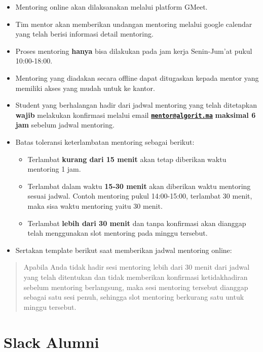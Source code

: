 \documentclass[
]{book}
\providecommand{\tightlist}{%
  \setlength{\itemsep}{0pt}\setlength{\parskip}{0pt}}
\begin{document}
\begin{itemize}
\tightlist
\item
  Mentoring online akan dilaksanakan melalui platform GMeet.
\item
  Tim mentor akan memberikan undangan mentoring melalui google calendar yang telah berisi informasi detail mentoring.
\item
  Proses mentoring \textbf{hanya} bisa dilakukan pada jam kerja Senin-Jum'at pukul 10:00-18:00.
\item
  Mentoring yang diadakan secara offline dapat ditugaskan kepada mentor yang memiliki akses yang mudah untuk ke kantor.
\item
  Student yang berhalangan hadir dari jadwal mentoring yang telah ditetapkan \textbf{wajib} melakukan konfirmasi melalui email \textbf{\href{mailto:mentor@algorit.ma}{\nolinkurl{mentor@algorit.ma}}} \textbf{maksimal 6 jam} sebelum jadwal mentoring.
\item
  Batas toleransi keterlambatan mentoring sebagai berikut:

  \begin{itemize}
  \tightlist
  \item
    Terlambat \textbf{kurang dari 15 menit} akan tetap diberikan waktu mentoring 1 jam.
  \item
    Terlambat dalam waktu \textbf{15-30 menit} akan diberikan waktu mentoring sesuai jadwal. Contoh mentoring pukul 14:00-15:00, terlambat 30 menit, maka sisa waktu mentoring yaitu 30 menit.
  \item
    Terlambat \textbf{lebih dari 30 menit} dan tanpa konfirmasi akan dianggap telah menggunakan slot mentoring pada minggu tersebut.
  \end{itemize}
\item
  Sertakan template berikut saat memberikan jadwal mentoring online:
\end{itemize}

\begin{quote}
Apabila Anda tidak hadir sesi mentoring lebih dari 30 menit dari jadwal yang telah ditentukan dan tidak memberikan konfirmasi ketidakhadiran sebelum mentoring berlangsung, maka sesi mentoring tersebut dianggap sebagai satu sesi penuh, sehingga slot mentoring berkurang satu untuk minggu tersebut.
\end{quote}

\hypertarget{slack-alumni}{%
\section{Slack Alumni}\label{slack-alumni}}
\end{document}

